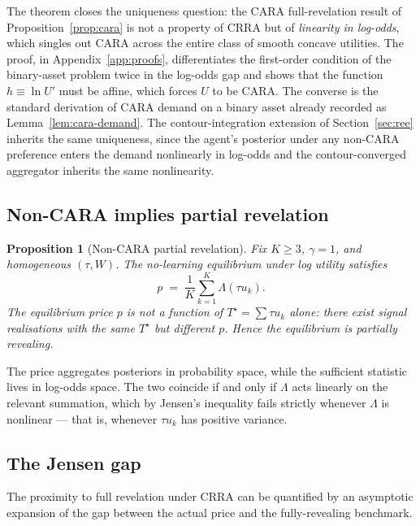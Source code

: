\documentclass[12pt,letterpaper]{article}
\newtheorem{proposition}{Proposition}
\theoremstyle{definition}
\theoremstyle{remark}
\newcommand{\Lam}{\Lambda}            %
\newcommand{\Tstar}{T^{\!\star}}
\newcommand{\1}{\mathbf{1}}
\begin{document}
The theorem closes the uniqueness question: the CARA full-revelation
result of Proposition~\ref{prop:cara} is not a property of CRRA but of
\emph{linearity in log-odds}, which singles out CARA across the entire
class of smooth concave utilities. The proof, in
Appendix~\ref{app:proofs}, differentiates the first-order condition of
the binary-asset problem twice in the log-odds gap and shows that the
function $h\equiv\ln U'$ must be affine, which forces $U$ to be CARA.
The converse is the standard derivation of CARA demand on a binary asset
already recorded as Lemma~\ref{lem:cara-demand}. The contour-integration
extension of Section~\ref{sec:ree} inherits the same uniqueness, since
the agent's posterior under any non-CARA preference enters the demand
nonlinearly in log-odds and the contour-converged aggregator inherits
the same nonlinearity.

\subsection{Non-CARA implies partial revelation}

\begin{proposition}[Non-CARA partial revelation]\label{prop:non-cara}
Fix $K\geq 3$, $\gamma=1$, and homogeneous $(\tau,W)$. The no-learning
equilibrium under log utility satisfies
\begin{equation}
   p \;=\; \frac{1}{K}\sum_{k=1}^{K}\Lam(\tau u_{k}).
\label{eq:log-clearing}
\end{equation}
The equilibrium price $p$ is not a function of $\Tstar=\sum\tau u_{k}$ alone:
there exist signal realisations with the same $\Tstar$ but different $p$.
Hence the equilibrium is partially revealing.
\end{proposition}

\noindent The price aggregates posteriors in probability space, while the
sufficient statistic lives in log-odds space. The two coincide if and only
if $\Lam$ acts linearly on the relevant summation, which by Jensen's
inequality fails strictly whenever $\Lam$ is nonlinear --- that is, whenever
$\tau u_{k}$ has positive variance.

\subsection{The Jensen gap}

The proximity to full revelation under CRRA can be quantified by an
asymptotic expansion of the gap between the actual price and the
fully-revealing benchmark.
\end{document}
